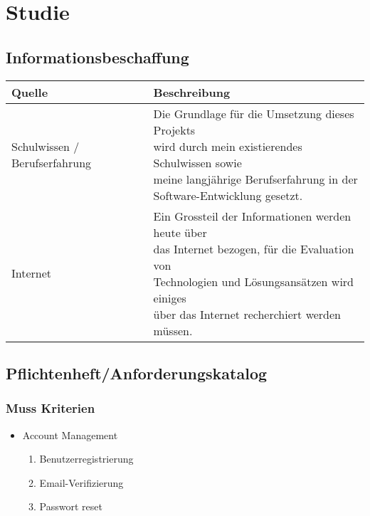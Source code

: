 \chapter{Studie}

\label{AppendixStudie}

\section{Informationsbeschaffung}\label{informationsbeschaffung}

\begin{longtable}[]{@{}ll@{}}
  \toprule
  Quelle                        & Beschreibung\tabularnewline
  \toprule
  Schulwissen / Berufserfahrung & \makecell[l]{Die Grundlage für die Umsetzung dieses Projekts   \\ wird durch mein existierendes Schulwissen sowie \\ meine langjährige Berufserfahrung in der \\ Software-Entwicklung gesetzt.} \tabularnewline
  \midrule
  Internet                      & \makecell[l]{Ein Grossteil der Informationen werden heute über \\ das Internet bezogen, für die Evaluation von \\ Technologien und Lösungsansätzen wird einiges \\ über das Internet recherchiert werden müssen.} \tabularnewline
  \bottomrule
\end{longtable}

\section{Pflichtenheft/Anforderungskatalog}\label{pflichtenheftanforderungskatalog}

\subsection{Muss Kriterien}\label{muss-kriterien}

\begin{itemize}
  \tightlist
  \item
        Account Management
        \begin{enumerate}
          \def\labelenumi{\arabic{enumi}.}
          \tightlist
          \item
                Benutzerregistrierung
          \item
                Email-Verifizierung
          \item
                Passwort reset
        \end{enumerate}
\end{itemize}

